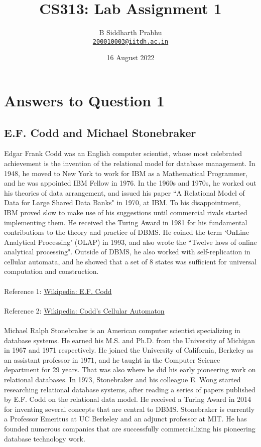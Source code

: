 \documentclass{article}
\title{CS313: Lab Assignment 1}
\author{
  B Siddharth Prabhu\\
  \href{mailto:200010003@iitdh.ac.in}{\texttt{200010003@iitdh.ac.in}}
  }
\date{16 August 2022}
\begin{document}
\maketitle

\section{Answers to Question 1}
\subsection{E.F. Codd and Michael Stonebraker}
Edgar Frank Codd was an English computer scientist, whose most celebrated achievement is the invention of the relational model for database management. In 1948, he moved to New York to work for IBM as a Mathematical Programmer, and he was appointed IBM Fellow in 1976. In the 1960s and 1970s, he worked out his theories of data arrangement, and issued his paper ``A Relational Model of Data for Large Shared Data Banks" in 1970, at IBM. To his disappointment, IBM proved slow to make use of his suggestions until commercial rivals started implementing them. He received the Turing Award in 1981 for his fundamental contributions to the theory and practice of DBMS. He coined the term `OnLine Analytical Processing' (OLAP) in 1993, and also wrote the ``Twelve laws of online analytical processing". Outside of DBMS, he also worked with self-replication in cellular automata, and he showed that a set of 8 states was sufficient for universal computation and construction.
\\ \\
Reference 1:
{\color{blue}
\href{https://en.wikipedia.org/wiki/Edgar_F._Codd}
{Wikipedia: E.F. Codd}
}
\\ \\ 
Reference 2:
{\color{blue}
\href{https://en.wikipedia.org/wiki/Codd's_cellular_automaton}
{Wikipedia: Codd's Cellular Automaton}
}
\\ \\
Michael Ralph Stonebraker is an American computer scientist specializing in database systems. He earned his M.S. and Ph.D. from the University of Michigan in 1967 and 1971 respectively. He joined the University of California, Berkeley as an assistant professor in 1971, and he taught in the Computer Science department for 29 years. That was also where he did his early pioneering work on relational databases. In 1973, Stonebraker and his colleague E. Wong started researching relational database systems, after reading a series of papers published by E.F. Codd on the relational data model. He received a Turing Award in 2014 for inventing several concepts that are central to DBMS. Stonebraker is currently a Professor Emeritus at UC Berkeley and an adjunct professor at MIT. He has founded numerous companies that are successfully commercializing his pioneering database technology work.
\end{document}
